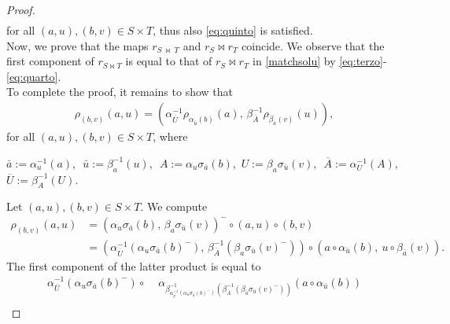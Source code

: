 \documentclass[preprint,1p]{elsarticle}
\theoremstyle{definition}               %
\newcommand{\rhoo}[2]{\rho_{#1}{#2}}
\newcommand{\sigmaa}[2]{\sigma_{#1}{#2}}
\newcommand{\alphaa}[3]{\alpha^{#1}_{#2}{#3}}
\begin{document}
\begin{proof}
\begin{align*}
\end{align*}  
for all $(a, u), (b, v) \in S \times T$, thus also \eqref{eq:quinto} is satisfied.\\
Now, we prove that the maps $r_{S \ \bowtie \ T}$ and $r_S \bowtie r_T$ coincide. We observe that the first component of $r_{S \bowtie T}$ is equal to that of $r_S \bowtie r_T$ in \eqref{matchsolu} by \eqref{eq:terzo}-\eqref{eq:quarto}.\\
To complete the proof, it remains to show that
\begin{align*}
    \rho_{(b, v)}(a, u)=\left(\alphaa{-1}{\overline{U}}{\rhoo{\alphaa{}{\bar{u}}{\left(b\right)}}{\left(a\right)}},\,  \beta^{-1}_{\overline{A}}\rhoo{\beta_{\bar{a}}\left(v\right)}{\left(u\right)}\right),
\end{align*}
for all $(a, u), (b, v) \in S \times T$, where
\begin{center}
		   $\bar{a}:=\alphaa{-1}{u}{\left(a\right)}$, \,\,$\bar{u}:= \beta^{-1}_{a}\left(u\right)$,\,\, $A:=\alphaa{}{u}{\sigmaa{\bar{a}}{\left(b\right)}}$,\, $U:=\beta_a\sigmaa{\bar{u}}{\left(v\right)}$,\,\, $\overline{A}:=\alphaa{-1}{U}{\left(A\right)}$,\,\, $\overline{U}:= \beta^{-1}_{A}\left(U\right)$.
		\end{center}
Let $(a, u), (b, v) \in S \times T$. We compute
\begin{align*}
    \rho_{(b, v)}(a, u)&=\left(\alpha_u\sigma_{\bar{a}}(b), \, \beta_a\sigma_{\bar{u}}(v)\right)^- \circ  (a, u) \circ (b, v)\\
   &=\left(\alpha^{-1}_{\overline{U}}\left(\alpha_u\sigma_{\bar{a}}(b)^-\right), \, \beta^{-1}_{\overline{A}}\left(\beta_a\sigma_{\bar{u}}(v)^-\right)\right)\circ  \left(a \circ \alpha_{\bar{u}}(b),\ u \circ \beta_{\bar{a}}(v)\right).
\end{align*}
The first component of the latter product is equal to 
\begin{align*}
   \alpha^{-1}_{\overline{U}}\left(\alpha_u\sigma_{\bar{a}}(b)^-\right) \circ\, &\,\alpha_{\beta^{-1}_{\alpha^{-1}_{\overline{U}}\left(\alpha_u\sigma_{\bar{a}}(b)^-\right)}\left(\beta^{-1}_{\overline{A}}\left(\beta_a\sigma_{\bar{u}}(v)^-\right)\right)}\left(a \circ \alpha_{\bar{u}}(b)\right)\\

\end{align*}
\end{proof}
\end{document}
